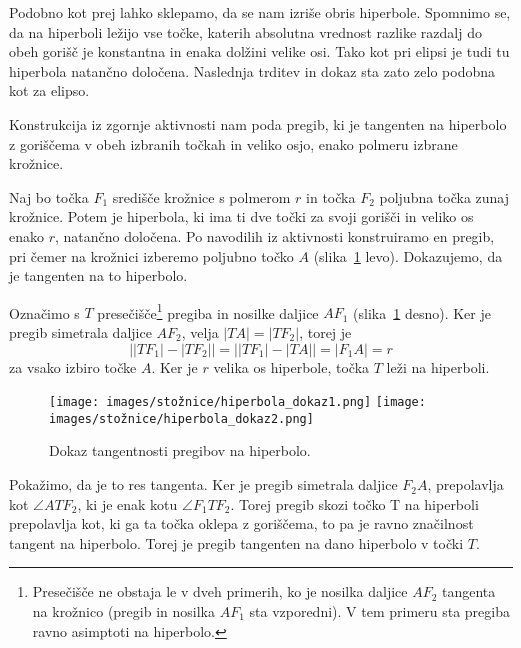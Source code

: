 Podobno kot prej lahko sklepamo, da se nam izriše obris hiperbole. Spomnimo se, da na hiperboli ležijo vse točke, katerih absolutna vrednost razlike razdalj do obeh gorišč je konstantna in enaka dolžini velike osi. Tako kot pri elipsi je tudi tu hiperbola natančno določena. Naslednja trditev in dokaz sta zato zelo podobna kot za elipso.

\begin{trditev}
    Konstrukcija iz zgornje aktivnosti nam poda pregib, ki je tangenten na hiperbolo z goriščema v obeh izbranih točkah in veliko osjo, enako polmeru izbrane krožnice.
\end{trditev}

\begin{dokaz}
    Naj bo točka $F_1$ središče krožnice s polmerom $r$ in točka $F_2$ poljubna točka zunaj krožnice. Potem je hiperbola, ki ima ti dve točki za svoji gorišči in veliko os enako $r$, natančno določena. Po navodilih iz aktivnosti konstruiramo en pregib, pri čemer na krožnici izberemo poljubno točko $A$ (slika~\ref{fig:dokaz_hiperbola} levo). Dokazujemo, da je tangenten na to hiperbolo.

    Označimo s $T$ presečišče\footnote{Presečišče ne obstaja le v dveh primerih, ko je nosilka daljice $AF_2$ tangenta na krožnico (pregib in nosilka $AF_1$ sta vzporedni). V tem primeru sta pregiba ravno asimptoti na hiperbolo.} pregiba in nosilke daljice $AF_1$ (slika~\ref{fig:dokaz_hiperbola} desno). Ker je pregib simetrala daljice $AF_2$, velja $|TA| = |TF_2|$, torej je 
    $$\left||TF_1| - |TF_2|\right| = \left||TF_1| - |TA|\right| = |F_1A| = r$$
    za vsako izbiro točke $A$. Ker je $r$ velika os hiperbole, točka $T$ leži na hiperboli.

    \begin{figure}[h]
        \centering
        \texttt{[image: images/stožnice/hiperbola\_dokaz1.png]}
        \texttt{[image: images/stožnice/hiperbola\_dokaz2.png]}
        \caption[Tangentnost na hiperbolo]{Dokaz tangentnosti pregibov na hiperbolo.}
        \label{fig:dokaz_hiperbola}
    \end{figure}

    Pokažimo, da je to res tangenta. Ker je pregib simetrala daljice $F_2A$,  prepolavlja kot $\angle ATF_2$, ki je enak kotu $\angle F_1TF_2$. Torej pregib skozi točko T na hiperboli prepolavlja kot, ki ga ta točka oklepa z goriščema, to pa je ravno značilnost tangent na hiperbolo. Torej je pregib tangenten na dano hiperbolo v točki $T$.
\end{dokaz}


